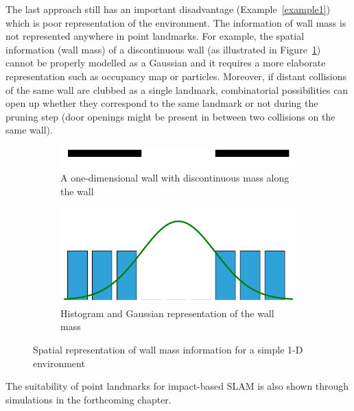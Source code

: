 The last approach still has an important disadvantage (Example~\ref{example1}) which is poor representation of the environment. The information of wall mass is not represented anywhere in point landmarks. For example, the spatial information (wall mass) of a discontinuous wall (as illustrated in Figure~\ref{gaussian_wall}) cannot be properly modelled as a Gaussian and it requires a more elaborate representation such as occupancy map or particles. Moreover, if distant collisions of the same wall are clubbed as a single landmark, combinatorial possibilities can open up whether they correspond to the same landmark or not during the pruning step (door openings might be present in between two collisions on the same wall). 
\begin{figure}
\centering
\begin{subfigure}{0.5\textwidth}
\includegraphics[scale=0.4]{./images/actual_wall.png}
\caption{A one-dimensional wall with discontinuous mass along the wall}
\end{subfigure}
\begin{subfigure}{0.5\textwidth}
\includegraphics[scale=0.4]{./images/gaussian_wall.png}
\caption{Histogram and Gaussian representation of the wall mass}
\end{subfigure}
\caption[Spatial representation of a map information]{Spatial representation of wall mass information for a simple 1-D environment}
\label{gaussian_wall}
\end{figure}

The suitability of point landmarks for impact-based SLAM is also shown through simulations in the forthcoming chapter. 

